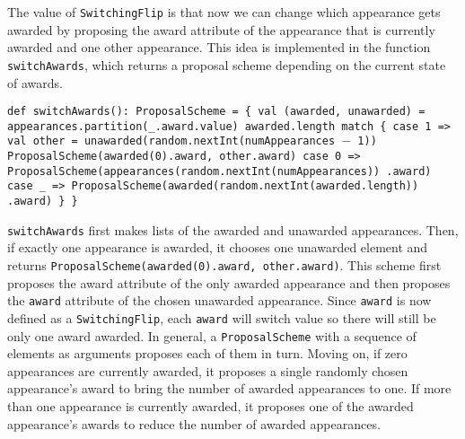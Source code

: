 The value of \texttt{SwitchingFlip} is that now we can change which appearance gets awarded by proposing the award attribute of the appearance that is currently awarded and one other appearance. This idea is implemented in the function \texttt{switchAwards}, which returns a proposal scheme depending on the current state of awards.

\begin{flushleft}
\texttt{def switchAwards(): ProposalScheme = \{
\newline \tab val (awarded, unawarded) = 
\newline \tab appearances.partition(\_.award.value)
\newline \tab awarded.length match \{
\newline \tab case 1 =>
\newline \tab val other = unawarded(random.nextInt(numAppearances $-$ 1)) 
\newline \tab ProposalScheme(awarded(0).award, other.award)
\newline \tab case 0 => 
\newline \tab ProposalScheme(appearances(random.nextInt(numAppearances))
\newline \tab .award)
\newline \tab case \_ => 
\newline \tab ProposalScheme(awarded(random.nextInt(awarded.length))
\newline \tab .award)
\newline \}
\newline \}
}
\end{flushleft}

\texttt{switchAwards} first makes lists of the awarded and unawarded appearances. Then, if exactly one appearance is awarded, it chooses one unawarded element and returns \texttt{ProposalScheme(awarded(0).award, other.award)}. This scheme first proposes the award attribute of the only awarded appearance and then proposes the \texttt{award} attribute of the chosen unawarded appearance. Since \texttt{award} is now defined as a \texttt{SwitchingFlip}, each \texttt{award} will switch value so there will still be only one award awarded. In general, a \texttt{ProposalScheme} with a sequence of elements as arguments proposes each of them in turn. Moving on, if zero appearances are currently awarded, it proposes a single randomly chosen appearance's award to bring the number of awarded appearances to one. If more than one appearance is currently awarded, it proposes one of the awarded appearance's awards to reduce the number of awarded appearances.

